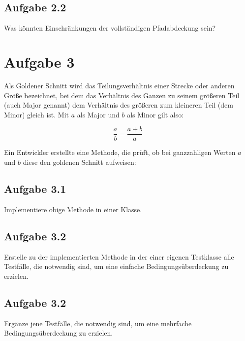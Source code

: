 \subsection*{Aufgabe 2.2}
Was könnten Einschränkungen der vollständigen Pfadabdeckung sein?

\newpage
\section*{Aufgabe 3}
Als Goldener Schnitt wird das Teilungsverhältnis einer Strecke oder anderen Größe bezeichnet, bei dem das Verhältnis des Ganzen zu seinem größeren Teil (auch Major genannt) dem Verhältnis des größeren zum kleineren Teil (dem Minor) gleich ist. Mit $a$ als Major und $b$ als Minor gilt also:

\[  
\frac{a}{b} = \frac{a + b}{a}
\]

Ein Entwickler erstellte eine Methode, die prüft, ob bei ganzzahligen Werten $a$ und $b$ diese den goldenen Schnitt aufweisen: 



\subsection*{Aufgabe 3.1}

Implementiere obige Methode in einer Klasse.

\subsection*{Aufgabe 3.2}

Erstelle zu der implementierten Methode in der einer eigenen Testklasse alle Testfälle, die notwendig sind, um eine einfache Bedingungsüberdeckung zu erzielen.

\subsection*{Aufgabe 3.2}

Ergänze jene Testfälle, die notwendig sind, um eine mehrfache Bedingungsüberdeckung zu erzielen.

